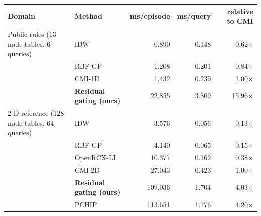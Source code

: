 \small
\begin{tabular}{llrrr}\toprule
Domain & Method & ms/episode & ms/query & relative to CMI \\\midrule
Public rules ($13$-node tables, $6$ queries) & IDW & 0.890 & 0.148 & 0.62$\times$ \\
 & RBF-GP & 1.208 & 0.201 & 0.84$\times$ \\
 & CMI-1D & 1.432 & 0.239 & 1.00$\times$ \\
 & \textbf{Residual gating (ours)} & 22.855 & 3.809 & 15.96$\times$ \\
\midrule
2-D reference ($128$-node tables, $64$ queries) & IDW & 3.576 & 0.056 & 0.13$\times$ \\
 & RBF-GP & 4.140 & 0.065 & 0.15$\times$ \\
 & OpenRCX-LI & 10.377 & 0.162 & 0.38$\times$ \\
 & CMI-2D & 27.043 & 0.423 & 1.00$\times$ \\
 & \textbf{Residual gating (ours)} & 109.036 & 1.704 & 4.03$\times$ \\
 & PCHIP & 113.651 & 1.776 & 4.20$\times$ \\
\bottomrule\end{tabular}
